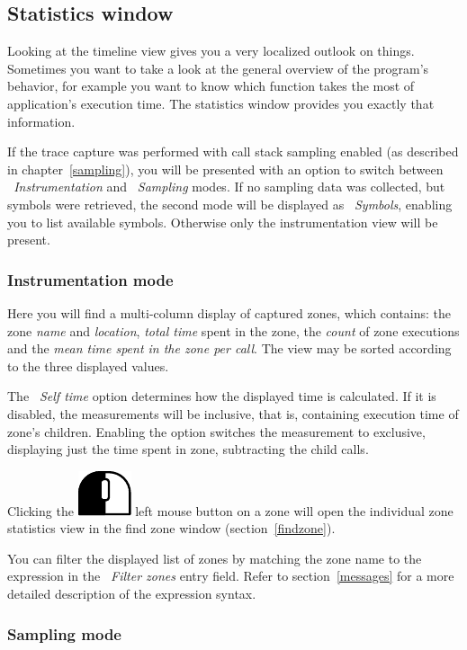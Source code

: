 \documentclass[hidelinks,titlepage,a4paper]{article}
\newcommand{\LMB}{\includegraphics[height=.8\baselineskip]{icons/lmb}}
\begin{document}
\subsection{Statistics window}
\label{statistics}

Looking at the timeline view gives you a very localized outlook on things. Sometimes you want to take a look at the general overview of the program's behavior, for example you want to know which function takes the most of application's execution time. The statistics window provides you exactly that information.

If the trace capture was performed with call stack sampling enabled (as described in chapter~\ref{sampling}), you will be presented with an option to switch between \emph{\faSyringe{}~Instrumentation} and \emph{\faEyeDropper{}~Sampling} modes. If no sampling data was collected, but symbols were retrieved, the second mode will be displayed as \emph{\faPuzzlePiece{}~Symbols}, enabling you to list available symbols. Otherwise only the instrumentation view will be present.

\subsubsection{Instrumentation mode}

Here you will find a multi-column display of captured zones, which contains: the zone \emph{name} and \emph{location}, \emph{total time} spent in the zone, the \emph{count} of zone executions and the \emph{mean time spent in the zone per call}. The view may be sorted according to the three displayed values.

The \emph{\faClock{}~Self time} option determines how the displayed time is calculated. If it is disabled, the measurements will be inclusive, that is, containing execution time of zone's children. Enabling the option switches the measurement to exclusive, displaying just the time spent in zone, subtracting the child calls.

Clicking the \LMB{} left mouse button on a zone will open the individual zone statistics view in the find zone window (section~\ref{findzone}).

You can filter the displayed list of zones by matching the zone name to the expression in the \emph{\faFilter{}~Filter zones} entry field. Refer to section~\ref{messages} for a more detailed description of the expression syntax.

\subsubsection{Sampling mode}
\label{statisticssampling}
\end{document}
